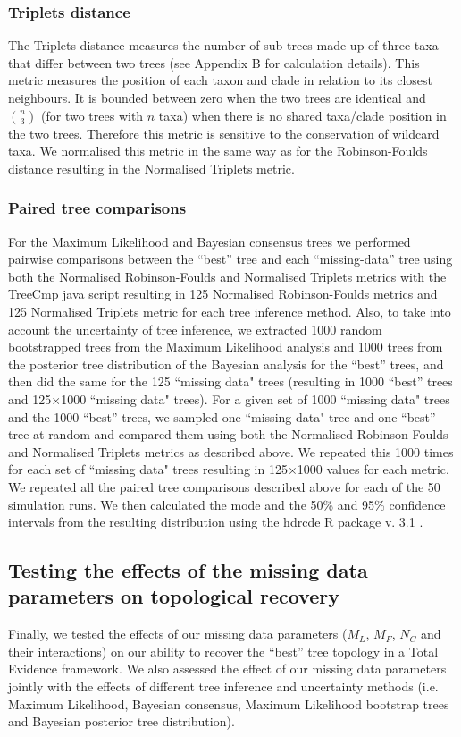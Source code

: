 \documentclass[12pt,letterpaper]{article}
\begin{document}
\subsubsection{Triplets distance}
The Triplets distance \citep{dobson1975triplets} measures the number of sub-trees made up of three taxa that differ between two trees \citep{critchlowthe1996} (see Appendix B for calculation details).
This metric measures the position of each taxon and clade in relation to its closest neighbours.
It is bounded between zero when the two trees are identical and $\binom{n}{3}$ (for two trees with $n$ taxa) when there is no shared taxa/clade position in the two trees.
Therefore this metric is sensitive to the conservation of wildcard taxa.
We normalised this metric in the same way as for the Robinson-Foulds distance resulting in the Normalised Triplets metric.

\subsubsection{Paired tree comparisons}
\label{tree_comparisons}
For the Maximum Likelihood and Bayesian consensus trees we performed pairwise comparisons between the ``best'' tree and each ``missing-data'' tree using both the Normalised Robinson-Foulds and Normalised Triplets metrics with the TreeCmp java script \citep{Bogdanowicz2012} resulting in 125 Normalised Robinson-Foulds metrics and 125 Normalised Triplets metric for each tree inference method.
Also, to take into account the uncertainty of tree inference, we extracted 1000 random bootstrapped trees from the Maximum Likelihood analysis and 1000 trees from the posterior tree distribution of the Bayesian analysis for the ``best'' trees, and then did the same for the 125 ``missing data" trees (resulting in 1000 ``best'' trees and 125$\times$1000 ``missing data" trees). 
For a given set of 1000 ``missing data" trees and the 1000 ``best'' trees, we sampled one ``missing data" tree and one ``best'' tree at random and compared them using both the Normalised Robinson-Foulds and Normalised Triplets metrics as described above.
We repeated this 1000 times for each set of ``missing data" trees resulting in 125$\times$1000 values for each metric.
We repeated all the paired tree comparisons described above for each of the 50 simulation runs.
We then calculated the mode and the 50\% and 95\% confidence intervals from the resulting distribution using the hdrcde R package v. 3.1 \citep{hdrcde}.

\subsection{Testing the effects of the missing data parameters on topological recovery}
Finally, we tested the effects of our missing data parameters ($M_{L}$, $M_{F}$, $N_{C}$ and their interactions) on our ability to recover the ``best'' tree topology in a Total Evidence framework.
We also assessed the effect of our missing data parameters jointly with the effects of different tree inference and uncertainty methods (i.e. Maximum Likelihood, Bayesian consensus, Maximum Likelihood bootstrap trees and Bayesian posterior tree distribution).
\end{document}

